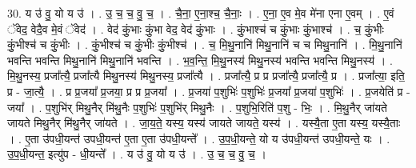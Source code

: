 \documentclass[17pt]{extarticle}
\begin{document}
30. य उ॑ वु॒ यो य उ॑ । . उ॒ च॒ च॒ वु॒ च॒ । . चै॒ना॒ ए॒ना॒श्च॒ चै॒नाः॒ । . ए॒ना॒ ए॒व मे॒व मे॑ना एना ए॒वम् । . ए॒वं ॅवेद॒ वेदै॒व मे॒वं ॅवेद॑ । . वेद॑ कुं॒भाः कुं॒भा वेद॒ वेद॑ कुं॒भाः । . कुं॒भाश्च॑ च कुं॒भाः कुं॒भाश्च॑ । . च॒ कुं॒भीः कुं॒भीश्च॑ च कुं॒भीः । . कुं॒भीश्च॑ च कुं॒भीः कुं॒भीश्च॑ । . च॒ मि॒थु॒नानि॑ मिथु॒नानि॑ च च मिथु॒नानि॑ । . मि॒थु॒नानि॑ भवन्ति भवन्ति मिथु॒नानि॑ मिथु॒नानि॑ भवन्ति । . भ॒व॒न्ति॒ मि॒थु॒नस्य॑ मिथु॒नस्य॑ भवन्ति भवन्ति मिथु॒नस्य॑ । . मि॒थु॒नस्य॒ प्रजा᳚त्यै॒ प्रजा᳚त्यै मिथु॒नस्य॑ मिथु॒नस्य॒ प्रजा᳚त्यै । . प्रजा᳚त्यै॒ प्र प्र प्रजा᳚त्यै॒ प्रजा᳚त्यै॒ प्र । . प्रजा᳚त्या॒ इति॒ प्र - जा॒त्यै॒ । . प्र प्र॒जया᳚ प्र॒जया॒ प्र प्र प्र॒जया᳚ । . प्र॒जया॑ प॒शुभिः॑ प॒शुभिः॑ प्र॒जया᳚ प्र॒जया॑ प॒शुभिः॑ । . प्र॒जयेति॑ प्र - जया᳚ । . प॒शुभि॑र् मिथु॒नैर् मि॑थु॒नैः प॒शुभिः॑ प॒शुभि॑र् मिथु॒नैः । . प॒शुभि॒रिति॑ प॒शु - भिः॒ । . मि॒थु॒नैर् जा॑यते जायते मिथु॒नैर् मि॑थु॒नैर् जा॑यते । . जा॒य॒ते॒ यस्य॒ यस्य॑ जायते जायते॒ यस्य॑ । . यस्यै॒ता ए॒ता यस्य॒ यस्यै॒ताः । . ए॒ता उ॑पधी॒यन्त॑ उपधी॒यन्त॑ ए॒ता ए॒ता उ॑पधी॒यन्ते᳚ । . उ॒प॒धी॒यन्ते॒ यो य उ॑पधी॒यन्त॑ उपधी॒यन्ते॒ यः । . उ॒प॒धी॒यन्त॒ इत्यु॑प - धी॒यन्ते᳚ । . य उ॑ वु॒ यो य उ॑ । . उ॒ च॒ च॒ वु॒ च॒ । \newline
\end{document}
